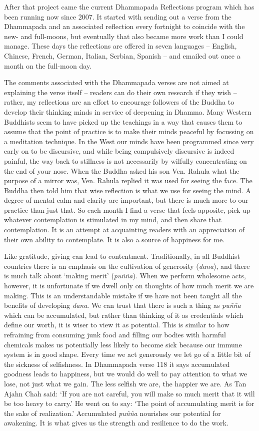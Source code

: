 After that project came the current
Dhammapada Reflections\cite{reflections}
program which has been running now since 2007.
It started with sending out a verse from the Dhammapada and an
associated reflection every fortnight to coincide with the new- and
full-moons, but eventually that also became more work than I could
manage. These days the reflections are offered in seven languages
-- English, Chinese, French,  German, Italian, Serbian, Spanish --
and emailed out once a month on the full-moon day.

The comments associated with the Dhammapada verses are not aimed at
explaining the verse itself -- readers can do their own research if they
wish -- rather, my reflections are an effort to encourage followers of
the Buddha to develop their thinking minds in service of deepening in
Dhamma. Many Western Buddhists seem to have picked up the teachings in a
way that causes them to assume that the point of practice is to make their
minds peaceful by focussing on a meditation technique. In the West our
minds have been programmed since very early on to be discursive, and
while being compulsively discursive is indeed painful, the way back to
stillness is not necessarily by wilfully concentrating on the end of
your nose. When the Buddha asked his son Ven. Rahula what the purpose of
a mirror was, Ven. Rahula replied it was used for seeing the face. The
Buddha then told him that wise reflection is what we use for seeing the
mind. A degree of mental calm and clarity are important, but there is
much more to our practice than just that. So each month I find a verse
that feels apposite, pick up whatever contemplation is stimulated in my
mind, and then share that contemplation. It is an attempt at acquainting
readers with an appreciation of their own ability to contemplate. It is
also a source of happiness for me.

Like gratitude, giving can lead to contentment. Traditionally, in all
Buddhist countries there is an emphasis on the cultivation of generosity
(\emph{dana}), and there is much talk about `making merit'
(\emph{puñña}). When we perform wholesome acts, however, it is
unfortunate if we dwell only on thoughts of how much merit we are
making. This is an understandable mistake if we have not been taught all
the benefits of developing \emph{dana}. We can trust that there is such
a thing as \emph{puñña} which can be accumulated, but rather than
thinking of it as credentials which define our worth, it is wiser to
view it as potential. This is similar to how refraining from consuming
junk food and filling our bodies with harmful chemicals makes us
potentially less likely to become sick because our immune system is in
good shape. Every time we act generously we let go of a little bit of
the sickness of selfishness. In Dhammapada verse 118 it says accumulated
goodness leads to happiness, but we would do well to pay attention to
what we lose, not just what we gain. The less selfish we are, the
happier we are. As Tan Ajahn Chah said: `If you are not careful, you
will make so much merit that it will be too heavy to carry.' He went on
to say: `The point of accumulating merit is for the sake of
realization.' Accumulated \emph{puñña} nourishes our potential for
awakening. It is what gives us the strength and resilience to do the
work.

